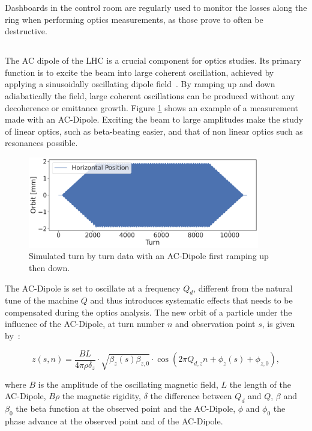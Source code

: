 Dashboards in the control room are regularly used to monitor the losses along the ring when
performing optics measurements, as those prove to often be destructive.

\subsection{}

The AC dipole of the LHC is a crucial component for optics studies. Its primary function is to
excite the beam into large coherent oscillation, achieved by applying a sinusoidally oscillating
dipole field~\cite{miyamoto_parametrization_2008}. By ramping up and down adiabatically the field,
large coherent oscillations can be produced without any decoherence or emittance growth. Figure
\ref{fig:ac_dipole} shows an example of a measurement made with an AC-Dipole.  Exciting the beam to
large amplitudes make the study of linear optics, such as beta-beating easier, and that of non
linear optics such as resonances possible.

\begin{figure}
    \center
    \includegraphics[width=0.9\textwidth]{./images/ac_dipole_tbt.pdf}
    \caption{Simulated turn by turn data with an AC-Dipole first ramping up then down.} 
    \label{fig:ac_dipole}
\end{figure}

The AC-Dipole is set to oscillate at a frequency $Q_d$, different from the natural tune of the
machine $Q$ and thus introduces systematic effects that needs to be compensated during the optics
analysis. The new orbit of a particle under the influence of the AC-Dipole, at turn number $n$ and
observation point $s$, is given by~\cite{serrano_lhc_2010}:

\begin{equation}
z(s, n) = \frac{BL}{4\pi\rho\delta_z} \cdot \sqrt{\beta_z(s) \beta_{z,0}} \cdot \cos \left( 2 \pi Q_{d,z}n + \phi_z(s) + \phi_{z,0}\right),
\label{eq:ac_dipole}
\end{equation}

where $B$ is the amplitude of the oscillating magnetic field, $L$ the length of the AC-Dipole,
$B\rho$ the magnetic rigidity, $\delta$ the difference between $Q_d$ and $Q$, $\beta$ and $\beta_0$
the beta function at the observed point and the AC-Dipole, $\phi$ and $\phi_0$ the phase advance at
the observed point and of the AC-Dipole.